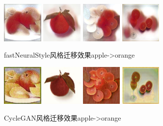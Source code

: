 \documentclass[conference]{IEEEtran}
\begin{document}
\begin{figure}[H]
	\centering
	\includegraphics[width=2cm]{PIC/apple2orange/ao1.jpg}
	\includegraphics[width=2cm]{PIC/apple2orange/ao2.jpg}
	\includegraphics[width=2cm]{PIC/apple2orange/ao3.jpg}
	\includegraphics[width=2cm]{PIC/apple2orange/ao4.jpg}
	\caption{fastNeuralStyle风格迁移效果apple->orange}
\end{figure}


\begin{figure}[H]
	\centering
	\includegraphics[width=2cm]{PIC/apple2orange/n07740461_1190_fake_A.png}
	\includegraphics[width=2cm]{PIC/apple2orange/n07740461_10571_fake_A.png}
	\includegraphics[width=2cm]{PIC/apple2orange/n07740461_12300_fake_A.png}
	\includegraphics[width=2cm]{PIC/apple2orange/n07740461_12360_fake_A.png}
	\caption{CycleGAN风格迁移效果apple->orange}
\end{figure}
\end{document}
